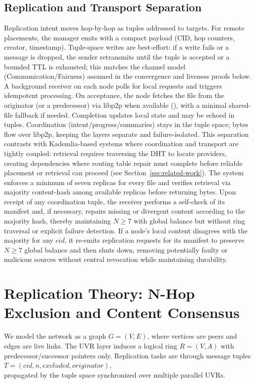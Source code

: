 \documentclass[runningheads]{llncs}
\begin{document}
\subsection{Replication and Transport Separation}
Replication intent moves hop-by-hop as tuples addressed to targets. For remote placements, the manager emits \texttt{} with a compact payload (CID, hop counters, creator, timestamp). Tuple-space writes are best-effort: if a write fails or a message is dropped, the sender retransmits until the tuple is accepted or a bounded TTL is exhausted; this matches the channel model (Communication/Fairness) assumed in the convergence and liveness proofs below. A background receiver on each node polls for local requests and triggers idempotent processing. On acceptance, the node fetches the file from the originator (or a predecessor) via libp2p when available (\texttt{}), with a minimal shared-file fallback if needed. Completion updates local state and may be echoed in tuples. Coordination (intent/progress/summaries) stays in the tuple space; bytes flow over libp2p, keeping the layers separate and failure-isolated. This separation contrasts with Kademlia-based systems where coordination and transport are tightly coupled: retrieval requires traversing the DHT to locate providers, creating dependencies where routing table repair must complete before reliable placement or retrieval can proceed (see Section~\ref{sec:related-work}). The system enforces a minimum of seven replicas for every file and verifies retrieval via majority content-hash among available replicas before returning bytes. Upon receipt of any coordination tuple, the receiver performs a self-check of its manifest and, if necessary, repairs missing or divergent content according to the majority hash, thereby maintaining \(N\ge 7\) with global balance but without ring traversal or explicit failure detection. If a node's local content disagrees with the majority for any \(\mathit{cid}\), it re-emits replication requests for its manifest to preserve \(N\ge 7\) global balance and then shuts down, removing potentially faulty or malicious sources without central revocation while maintaining durability.

\section{Replication Theory: N-Hop Exclusion and Content Consensus}
We model the network as a graph \(G=(V,E)\), where vertices are peers and edges are live links. The UVR layer induces a logical ring \(R=(V,A)\) with predecessor/successor pointers only. Replication tasks are through message tuples \\
$T=(\mathit{cid}, n, \mathit{excluded}, \mathit{originator})$,
\\
propagated by the tuple space synchronized over multiple parallel UVRs.
\end{document}
